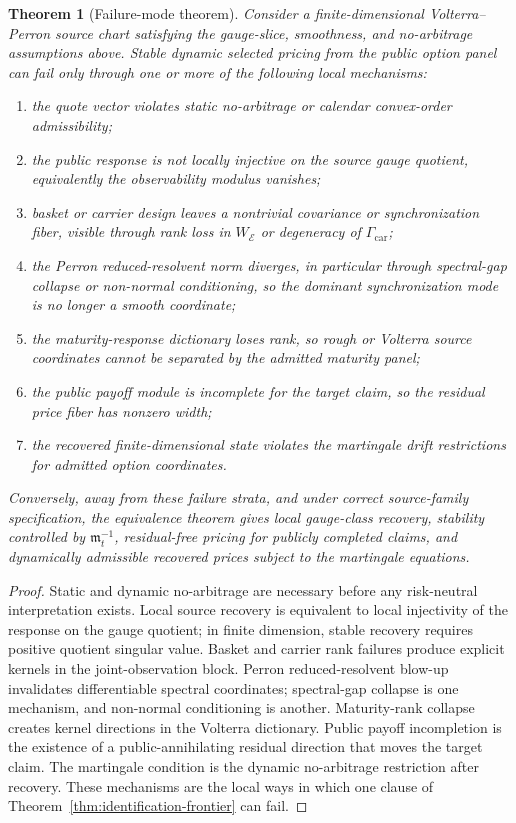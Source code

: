 \documentclass[11pt,a4paper]{amsart}
\theoremstyle{plain}
\newtheorem{theorem}{Theorem}[section]
\theoremstyle{definition}
\theoremstyle{remark}
\newcommand{\cE}{\mathcal{E}}
\begin{document}
\begin{theorem}[Failure-mode theorem]\label{thm:failure-atlas}
Consider a finite-dimensional Volterra--Perron source chart satisfying the gauge-slice,
smoothness, and no-arbitrage assumptions above.  Stable dynamic selected pricing from the public
option panel can fail only through one or more of the following local mechanisms:
\begin{enumerate}[leftmargin=2em]
\item the quote vector violates static no-arbitrage or calendar convex-order admissibility;
\item the public response is not locally injective on the source gauge quotient, equivalently
the observability modulus vanishes;
\item basket or carrier design leaves a nontrivial covariance or synchronization fiber, visible
through rank loss in \(W_{\cE}\) or degeneracy of \(\Gamma_{\mathrm{car}}\);
\item the Perron reduced-resolvent norm diverges, in particular through spectral-gap collapse or
non-normal conditioning, so the dominant synchronization mode is no longer a smooth coordinate;
\item the maturity-response dictionary loses rank, so rough or Volterra source coordinates
cannot be separated by the admitted maturity panel;
\item the public payoff module is incomplete for the target claim, so the residual price fiber
has nonzero width;
\item the recovered finite-dimensional state violates the martingale drift restrictions for
admitted option coordinates.
\end{enumerate}
Conversely, away from these failure strata, and under correct source-family specification, the
equivalence theorem gives local gauge-class recovery, stability controlled by
\(\mathfrak m_t^{-1}\), residual-free pricing for publicly completed claims, and dynamically
admissible recovered prices subject to the martingale equations.
\end{theorem}

\begin{proof}
Static and dynamic no-arbitrage are necessary before any risk-neutral interpretation exists.
Local source recovery is equivalent to local injectivity of the response on the gauge quotient;
in finite dimension, stable recovery requires positive quotient singular value.  Basket and
carrier rank failures produce explicit kernels in the joint-observation block.  Perron
reduced-resolvent blow-up invalidates differentiable spectral coordinates; spectral-gap collapse
is one mechanism, and non-normal conditioning is another.  Maturity-rank collapse creates kernel
directions in the Volterra dictionary.  Public payoff incompletion is the existence of a
public-annihilating residual direction that moves the target claim.  The martingale condition is
the dynamic no-arbitrage restriction after recovery.  These mechanisms are the local ways in
which one clause of Theorem~\ref{thm:identification-frontier} can fail.
\end{proof}
\end{document}
